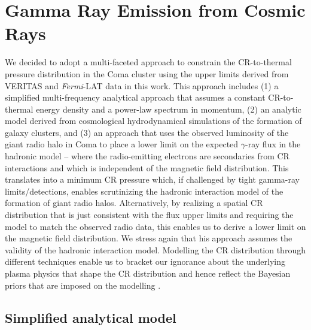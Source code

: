 \documentclass[12pt,manuscript]{aastex}
\begin{document}
\section{Gamma Ray Emission from Cosmic Rays}
We decided to adopt a multi-faceted approach to constrain the CR-to-thermal pressure distribution
in the Coma cluster using the upper limits derived from VERITAS and \emph{Fermi}-LAT data in this
work. This approach includes (1) a simplified multi-frequency analytical approach that assumes a
constant CR-to-thermal energy density and a power-law spectrum in momentum, (2) an analytic model
derived from cosmological hydrodynamical simulations of the formation of galaxy clusters, and (3)
an approach that uses the
observed luminosity of the giant radio halo in Coma to place a lower limit on the expected
$\gamma$-ray flux in the hadronic model -- where the radio-emitting electrons are secondaries from
CR interactions and which is independent of the magnetic field distribution.  This translates into a
minimum CR pressure which, if challenged by tight gamma-ray limits/detections, enables scrutinizing
the hadronic interaction model of the formation of giant radio halos. Alternatively, by realizing a
spatial CR distribution that is just consistent with the flux upper limits and requiring the model to
match the observed radio data, this enables us to derive a lower limit on the magnetic field
distribution. We stress again that his approach assumes the validity of the hadronic interaction
model. Modelling the CR distribution through different techniques enable
us to bracket our ignorance about the underlying plasma physics that shape the CR distribution and
hence reflect the Bayesian priors that are imposed on the modelling \citep[see][for a
discussion]{article:PinzkePfrommerBergstrom}.

%
%

\subsection{Simplified analytical model}
\label{sec:simple}
\end{document}
